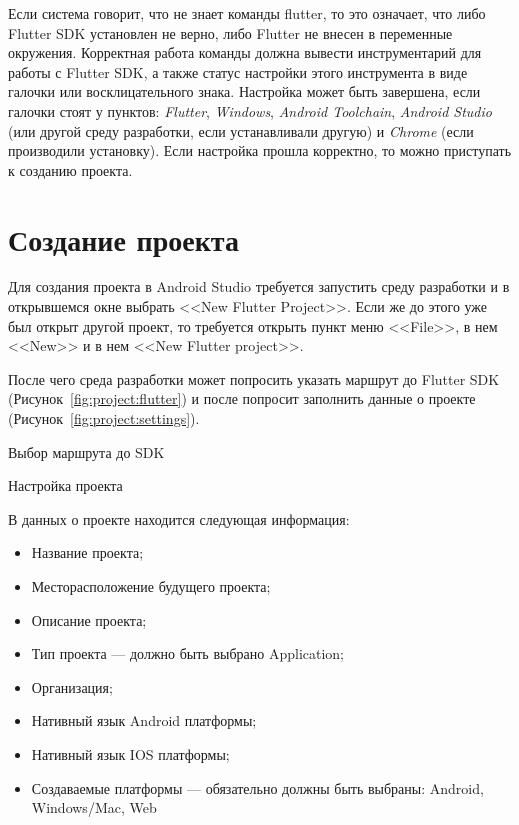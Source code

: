 Если система говорит, что не знает команды flutter,
то это означает, что либо Flutter SDK установлен не верно,
либо Flutter не внесен в переменные окружения.
Корректная работа команды должна вывести инструментарий
для работы с Flutter SDK,
а также статус настройки этого инструмента в виде галочки
или восклицательного знака. Настройка может быть завершена,
если галочки стоят у пунктов: \textit{Flutter}, \textit{Windows},
\textit{Android Toolchain}, \textit{Android Studio}
(или другой среду разработки, если устанавливали другую)
и \textit{Chrome} (если производили установку).
Если настройка прошла корректно, то можно приступать к созданию проекта.

\section{Создание проекта}

Для создания проекта в Android Studio требуется запустить среду разработки
и в открывшемся окне выбрать <<New Flutter Project>>.
Если же до этого уже был открыт другой проект,
то требуется открыть пункт меню <<File>>, в нем <<New>>
и в нем <<New Flutter project>>.\par
После чего среда разработки может попросить указать маршрут
до Flutter SDK (Рисунок~\ref{fig:project:flutter})
и после попросит заполнить данные о проекте
(Рисунок~\ref{fig:project:settings}).

\begin{image}
	\caption{Выбор маршрута до SDK}
	\label{fig:project:flutter}
\end{image}

\begin{image}
	\caption{Настройка проекта}
	\label{fig:project:settings}
\end{image}

В данных о проекте находится следующая информация:

\begin{itemize}
	\item Название проекта;
	\item Месторасположение будущего проекта;
	\item Описание проекта;
	\item Тип проекта --- должно быть выбрано Application;
	\item Организация;
	\item Нативный язык Android платформы;
	\item Нативный язык IOS платформы;
	\item Создаваемые платформы --- обязательно должны быть выбраны:
		Android, Windows/Mac, Web
\end{itemize}

